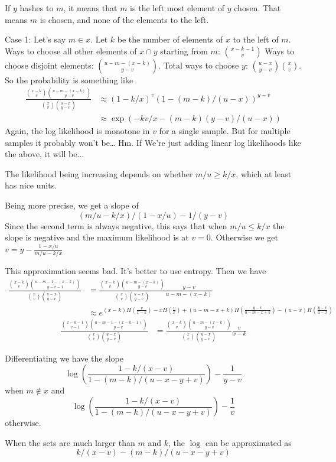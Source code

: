 If $y$ hashes to $m$, it means that $m$ is the left most element of $y$ chosen.
That means $m$ is chosen, and none of the elements to the left.

Case 1: Let's say $m\in x$.
Let $k$ be the number of elements of $x$ to the left of $m$.
Ways to choose all other elements of $x\cap y$ starting from $m$: $x-k-1\choose v$
Ways to choose disjoint elements: $u-m-(x-k)\choose y-v$.
Total ways to choose $y$: $\binom{u-x}{y-v}\binom{x}{v}$.
So the probability is something like
\begin{align}
\frac{\binom{x-k}{v}\binom{u-m-(x-k)}{y-v}}{\binom{x}{v}\binom{u-x}{y-v}}
&\approx
(1-k/x)^v(1-(m-k)/(u-x))^{y-v}
\\&\approx
\exp(-kv/x -(m-k)(y-v)/(u-x))
\end{align}
Again, the log likelihood is monotone in $v$ for a single sample.
But for multiple samples it probably won't be\dots
Hm. If We're just adding linear log likelihoods like the above, it will be...

The likelihood being increasing depends on whether $m/u\ge k/x$, which at least has nice units.

Being more precise, we get a slope of
\[
   (m/u - k/x )/(1 - x/u) - 1/(y - v)
\]
Since the second term is always negative, this says that when $m/u\le k/x$ the slope is negative and the maximum likelihood is at $v=0$.
Otherwise we get $v=y-\frac{1-x/u}{m/u-k/x}$

This approximation seems bad.
It's better to use entropy.
Then we have
\begin{align}
\frac{\binom{x-k}{v}\binom{u-m-1-(x-k)}{y-v-1}}{\binom{x}{v}\binom{u-x}{y-v}}
&= \frac{\binom{x-k}{v}\binom{u-m-(x-k)}{y-v}}{\binom{x}{v}\binom{u-x}{y-v}}\frac{y-v}{u-m-(x-k)}
\\&\approx e^{
   (x-k)H(\frac{v}{x-k})
   -x H(\frac{v}{x})
   +(u-m-x+k)H(\frac{y-v}{u-m-x+k})
   -(u-x) H(\frac{y-v}{u-x})}
\end{align}
\begin{align}
\frac{\binom{x-k-1}{v-1}\binom{u-m-1-(x-k-1)}{y-v}}{\binom{x}{v}\binom{u-x}{y-v}}
&= \frac{\binom{x-k}{v}\binom{u-m-(x-k)}{y-v}}{\binom{x}{v}\binom{u-x}{y-v}}\frac{v}{x-k}
\end{align}

Differentiating we have the slope
\[
   \log\left(\frac{1-k/(x-v)}{1-(m-k)/(u-x-y+v)}\right) - \frac{1}{y-v}
\]
when $m\not\in x$ and 
\[
   \log\left(\frac{1-k/(x-v)}{1-(m-k)/(u-x-y+v)}\right) - \frac{1}{v}
\]
otherwise.

When the sets are much larger than $m$ and $k$,
the $\log$ can be approximated as 
\[
k/(x-v) - (m-k)/(u-x-y+v)
\]

